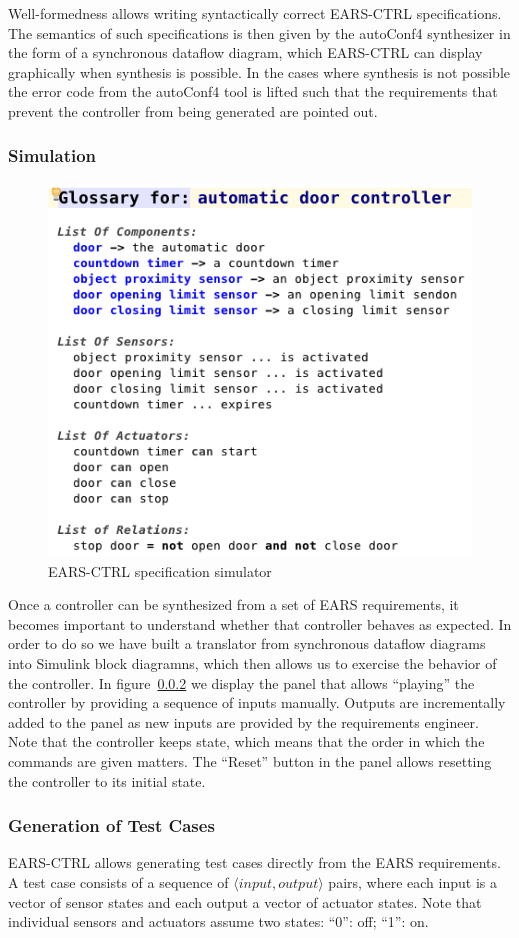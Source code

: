 Well-formedness allows writing syntactically correct \textsf{EARS-CTRL}
specifications. The semantics of such specifications is then given by the
\textsf{autoConf4} synthesizer in the form of a synchronous dataflow diagram,
which \textsf{EARS-CTRL} can display graphically when synthesis is possible. In
the cases where synthesis is not possible the error code from the
\textsf{autoConf4} tool is lifted such that the requirements that prevent the controller from being
generated are pointed out. 

\subsubsection{Simulation}

\begin{figure}[h!]
   \begin{center}
     \includegraphics[width=.1\textwidth]{images/glossary.png}
     \caption{\textsf{EARS-CTRL} specification simulator}
     \label{fig:ears_glossary}
   \end{center}
 \end{figure}

Once a controller can be synthesized from a set of EARS requirements, it becomes
important to understand whether that controller behaves as expected. In order to
do so we have built a translator from synchronous dataflow diagrams into
\textsf{Simulink} block diagramns, which then allows us to exercise the behavior
of the controller. In figure~\ref{} we display the panel that allows
``playing'' the controller by providing a sequence of inputs manually. Outputs
are incrementally added to the panel as new inputs are provided by the
requirements engineer. Note that the controller keeps state, which means that
the order in which the commands are given matters. The ``Reset'' button in the
panel allows resetting the controller to its initial state.

\subsubsection{Generation of Test Cases}

\textsf{EARS-CTRL} allows generating test cases directly from the EARS
requirements. A test case consists of a sequence of $\langle
  input, output \rangle$ pairs, where each input is a vector of sensor states
  and each output a vector of actuator states. Note that individual sensors and
  actuators assume two states: ``0'': off; ``1'': on.

